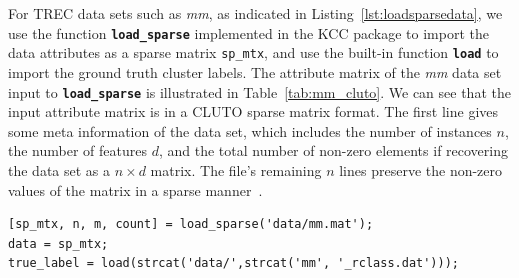 \documentclass[10pt]{acmtrans2e}
\newcommand{\package}[1]{\textsf{#1}\xspace} %
\newcommand{\function}[1]{\textbf{\texttt{#1}}}
\newcommand{\parameter}[1]{\texttt{#1}}
\begin{document}
For TREC data sets such as \textit{mm}, as indicated in Listing~\ref{lst:loadsparsedata}, we use the function \function{load\_sparse} implemented in the \package{KCC} package to import the data attributes as a sparse matrix \parameter{sp\_mtx}, and use the built-in function \function{load} to import the ground truth cluster labels. The attribute matrix of the \textit{mm} data set input to \function{load\_sparse} is illustrated in Table~\ref{tab:mm_cluto}. We can see that the input attribute matrix is in a CLUTO sparse matrix format. The first line gives some meta information of the data set, which includes the number of instances $n$, the number of features $d$, and the total number of non-zero elements if recovering the data set as a $n \times d$ matrix. The file's remaining $n$ lines preserve the non-zero values of the matrix in a sparse manner~\cite{karypis2002cluto}.
\begin{lstlisting}[caption={Using \function{load\_sparse}/\function{load} to import data attributes/ground truth cluster labels.},label=lst:loadsparsedata]
[sp_mtx, n, m, count] = load_sparse('data/mm.mat');
data = sp_mtx;
true_label = load(strcat('data/',strcat('mm', '_rclass.dat')));
\end{lstlisting}
\end{document}
